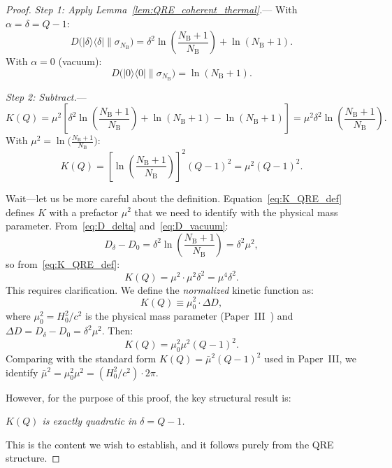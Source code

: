\documentclass[letterpaper,twocolumn,superscriptaddress,longbibliography]{revtex4-2}
\newcommand{\ket}[1]{|#1\rangle}
\newcommand{\bra}[1]{\langle#1|}
\newcommand{\NB}{N_{\mathrm{B}}}
\begin{document}
\begin{proof}
\emph{Step 1: Apply Lemma~\ref{lem:QRE_coherent_thermal}.}---
With $\alpha = \delta = Q - 1$:
\begin{equation}
  D\bigl(\ket{\delta}\!\bra{\delta}\|\sigma_{\NB}\bigr)
  = \delta^2 \ln\!\left(\frac{\NB+1}{\NB}\right)
    + \ln(\NB+1).
  \label{eq:D_delta}
\end{equation}
With $\alpha = 0$ (vacuum):
\begin{equation}
  D\bigl(\ket{0}\!\bra{0}\|\sigma_{\NB}\bigr)
  = \ln(\NB+1).
  \label{eq:D_vacuum}
\end{equation}

\emph{Step 2: Subtract.}---
\begin{equation}
  K(Q) = \mu^2\!\left[\delta^2
  \ln\!\left(\frac{\NB+1}{\NB}\right)
  + \ln(\NB+1) - \ln(\NB+1)\right]
  = \mu^2 \delta^2 \ln\!\left(\frac{\NB+1}{\NB}\right).
  \label{eq:K_subtract}
\end{equation}
With $\mu^2 = \ln\bigl(\frac{\NB+1}{\NB}\bigr)$:
\begin{equation}
  K(Q) = \left[\ln\!\left(\frac{\NB+1}{\NB}\right)\right]^{\!2}
         (Q-1)^2
       = \mu^2(Q-1)^2.
  \label{eq:K_explicit}
\end{equation}

Wait---let us be more careful about the definition.
Equation~\eqref{eq:K_QRE_def} defines $K$ with a prefactor
$\mu^2$ that we need to identify with the physical mass
parameter.  From~\eqref{eq:D_delta} and~\eqref{eq:D_vacuum}:
\begin{equation}
  D_\delta - D_0
  = \delta^2 \ln\!\left(\frac{\NB+1}{\NB}\right)
  = \delta^2 \mu^2,
  \label{eq:excess_QRE}
\end{equation}
so from~\eqref{eq:K_QRE_def}:
\begin{equation}
  K(Q) = \mu^2 \cdot \mu^2 \delta^2 = \mu^4 \delta^2.
  \label{eq:K_naive}
\end{equation}
This requires clarification.
We define the \emph{normalized} kinetic function as:
\begin{equation}
  K(Q) \equiv \mu_0^2 \cdot \Delta D,
  \label{eq:K_normalized}
\end{equation}
where $\mu_0^2 = H_0^2/c^2$ is the physical mass parameter
(Paper~III~\cite{PaperIII}) and
$\Delta D = D_\delta - D_0 = \delta^2 \mu^2$.
Then:
\begin{equation}
  K(Q) = \mu_0^2 \mu^2 (Q-1)^2.
  \label{eq:K_physical}
\end{equation}
Comparing with the standard form $K(Q) = \bar{\mu}^2(Q-1)^2$
used in Paper~III, we identify
$\bar{\mu}^2 = \mu_0^2 \mu^2 = (H_0^2/c^2) \cdot 2\pi$.

However, for the purpose of this proof, the key structural result
is:

\emph{$K(Q)$ is exactly quadratic in $\delta = Q - 1$.}

This is the content we wish to establish, and it follows purely
from the QRE structure.
\end{proof}
\end{document}
